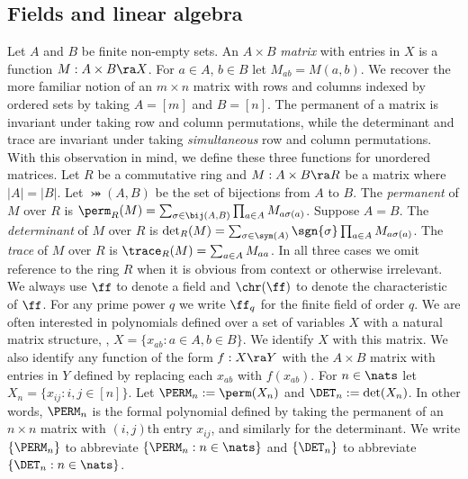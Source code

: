 \documentclass{toc}
\begin{document}
\subsection{Fields and linear algebra}
Let $A$ and $B$ be finite non-empty sets. An $A\times B$ \emph{matrix}
with entries in $X$ is a function $M : A \times B \ra X$. For $a \in A$, $b \in
B$ let $M_{ab} = M(a, b)$. We recover the more familiar notion of an $m \times
n$ matrix with rows and columns indexed by ordered sets by taking $A = [m]$ and
$B = [n]$.
The permanent of a matrix is invariant under taking row and column permutations,
while the determinant and trace are invariant under taking \emph{simultaneous}
row and column permutations.  With this observation in mind, we define these
three functions for unordered matrices.  Let $R$ be a commutative ring and $M : A
\times B \ra R$ be a matrix where $ \vert A \vert = \vert B \vert$. Let $\bij(A,
B)$ be the set of bijections from $A$ to $B$. The \emph{permanent} of $M$ over
$R$ is $\perm_R(M) = \sum_{\sigma \in \bij(A, B)}\prod_{a \in A} M_{a
  \sigma(a)}$.  Suppose $A = B$.  The \emph{determinant} of $M$ over $R$ is
$\det_R (M) = \sum_{\sigma \in \sym(A)}\sgn{\sigma}\prod_{a \in A} M_{a
  \sigma(a)}$.  The \emph{trace} of $M$ over $R$ is $\trace_R(M) = \sum_{a \in A}
M_{a a}$.  In all three cases we omit reference to the ring $R$ when it is
obvious from context or otherwise irrelevant.
We always use $\ff$ to denote a field and $\chr(\ff)$ to denote the
characteristic of $\ff$.  For any prime power $q$ we write $\ff_q$ for the
finite field of order $q$.  We are often interested in polynomials defined over a
set of variables $X$ with a natural matrix structure, \ie, $X = \{x_{ab} : a
\in A, b \in B\}$.  We identify $X$ with this matrix.  We also identify any
function of the form $f : X \ra Y$ with the $A \times B$ matrix with entries in
$Y$ defined by replacing each $x_{ab}$ with $f(x_{ab})$.
For $n \in \nats$ let $X_n = \{x_{ij} : i, j \in [n]\}$.  Let $\PERM_n :=
\perm(X_n)$ and $\DET_n := \det(X_n)$.  In other words, $\PERM_n$
is the formal polynomial defined by taking the permanent
of an $n \times n$ matrix with $(i, j)$th entry $x_{i j}$, and
similarly for the determinant.
We write $\{\PERM_n\}$ to abbreviate $\{\PERM_n : n \in \nats\}$ and $\{\DET_n\}$
to abbreviate $\{\DET_n : n \in \nats\}$.
\end{document}
